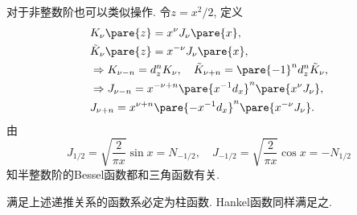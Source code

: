 \documentclass[hidelinks]{ctexart}
\begin{document}
对于非整数阶也可以类似操作. 令$z = x^2/2$, 定义
\begin{align*}
    & K_\nu\pare{z} = x^\nu J_\nu\pare{x}, \\
    & \tilde{K}_\nu\pare{z} = x^{-\nu}J_\nu\pare{x}, \\
    & \Rightarrow K_{\nu - n} = d_z^n K_\nu,\quad \tilde{K}_{\nu + n} = \pare{-1}^n d_z^n \tilde{K}_\nu, \\
    & \Rightarrow J_{\nu - n} = x^{-\nu + n}\pare{x^{-1}d_x}^n \pare{x^\nu J_\nu}, \\
    & J_{\nu + n} = x^{\nu + n}\pare{-x^{-1}d_x}^n \pare{x^{-\nu}J_\nu}.
\end{align*}
由
\[ J_{1/2} = \sqrt{\frac{2}{\pi x}} \sin x = N_{-1/2}, \quad J_{-1/2} = \sqrt{\frac{2}{\pi x}}\cos x = -N_{1/2} \]
知半整数阶的Bessel函数都和三角函数有关.
\begin{remark}
    满足上述递推关系的函数系必定为柱函数. Hankel函数同样满足之.
\end{remark}
\end{document}
